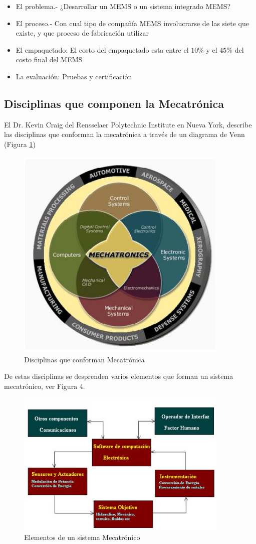 \documentclass[12pt]{book}
\theoremstyle{definition}
\theoremstyle{remark}
\theoremstyle{plain}
\begin{document}
\begin{itemize}
\item El problema.- ¿Desarrollar un MEMS o un sistema integrado MEMS?
\item El proceso.- Con cual tipo de compañía MEMS involucrarse de las siete que existe, y que proceso de fabricación utilizar
\item El empaquetado: El costo del empaquetado esta entre el $10\%$ y el $45\%$ del costo final del MEMS
\item La evaluación: Pruebas y certificación
\end{itemize}

\subsection{Disciplinas que componen la Mecatrónica}
El Dr. Kevin Craig del Rensselaer Polytechnic Institute en Nueva York, describe las disciplinas que conforman la mecatrónica a través de un diagrama de Venn (Figura \ref{fig3})

\begin{figure}
\centering
\includegraphics[width=4in]{mecatronica.jpg}
\caption{Disciplinas que conforman Mecatrónica}
\label{fig3}
\end{figure}

De estas disciplinas se desprenden varios elementos que forman un sistema mecatrónico, ver Figura 4.

\begin{figure}
\centering
\includegraphics[width=4in]{sistemamecatronico.jpg}
\caption{Elementos de un sistema Mecatrónico}
\label{fig4}
\end{figure}
\end{document}
